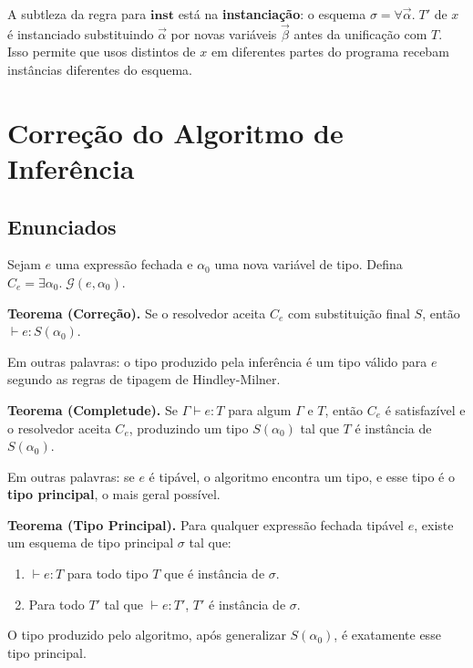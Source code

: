   A subtleza da regra para \(\mathbf{inst}\) está na
  \textbf{instanciação}: o esquema \(\sigma = \forall \vec{\alpha}.\;
  T'\) de \(x\) é instanciado substituindo \(\vec{\alpha}\) por
  novas variáveis \(\vec{\beta}\) antes da unificação com \(T\). Isso
  permite que usos distintos de \(x\) em diferentes partes do programa
  recebam instâncias diferentes do esquema.

  \section{Correção do Algoritmo de Inferência}

  \subsection{Enunciados}

  Sejam \(e\) uma expressão fechada e \(\alpha_0\) uma nova variável de tipo.
  Defina \(C_e = \exists \alpha_0.\; \mathcal{G}(e, \alpha_0)\).

  \textbf{Teorema (Correção).} Se o resolvedor aceita \(C_e\) com
  substituição final \(S\), então \(\vdash e : S(\alpha_0)\).

  Em outras palavras: o tipo produzido pela inferência é um tipo válido
  para \(e\) segundo as regras de tipagem de Hindley-Milner.

  \textbf{Teorema (Completude).} Se \(\Gamma \vdash e : T\) para algum
  \(\Gamma\) e \(T\), então \(C_e\) é satisfazível e o resolvedor
  aceita \(C_e\), produzindo um tipo \(S(\alpha_0)\) tal que \(T\) é
  instância de \(S(\alpha_0)\).

  Em outras palavras: se \(e\) é tipável, o algoritmo encontra um tipo,
  e esse tipo é o \textbf{tipo principal}, o mais geral possível.

  \textbf{Teorema (Tipo Principal).} Para qualquer expressão fechada
  tipável \(e\), existe um esquema de tipo principal \(\sigma\) tal que:

  \begin{enumerate}
    \item
      \(\vdash e : T\) para todo tipo \(T\) que é instância de \(\sigma\).
    \item
      Para todo \(T'\) tal que \(\vdash e : T'\), \(T'\) é instância de
      \(\sigma\).
  \end{enumerate}

  O tipo produzido pelo algoritmo, após generalizar \(S(\alpha_0)\),
  é exatamente esse tipo principal.


